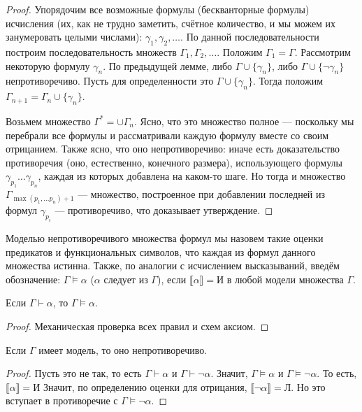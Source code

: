 \begin{proof}
Упорядочим все возможные формулы (бескванторные формулы) 
исчисления (их, как не трудно заметить,
счётное количество, и мы можем их занумеровать целыми числами):
$\gamma_1, \gamma_2, \dots$. По данной последовательности построим
последовательность множеств $\Gamma_1, \Gamma_2, \dots$.
Положим $\Gamma_1 = \Gamma$.
Рассмотрим некоторую формулу $\gamma_n$. По предыдущей лемме, либо 
$\Gamma \cup \{\gamma_n\}$, либо $\Gamma \cup \{\neg\gamma_n\}$ 
непротиворечиво. Пусть для определенности это $\Gamma \cup \{\gamma_n\}$.
Тогда положим $\Gamma_{n+1} = \Gamma_n \cup \{\gamma_n\}$.

Возьмем множество $\Gamma^* = \cup \Gamma_n$. Ясно, что это множество
полное --- поскольку мы перебрали все формулы и рассматривали каждую
формулу вместе со своим отрицанием.
Также ясно, что оно непротиворечиво: иначе есть
доказательство противоречия (оно, естественно, конечного размера),
использующего формулы $\gamma_{p_1} \dots \gamma_{p_n}$, каждая из которых
добавлена на каком-то шаге. Но тогда и множество 
$\Gamma_{\max(p_1, \dots p_n)+1}$ --- множество, построенное при добавлении
последней из формул $\gamma_{p_i}$ --- противоречиво, что доказывает 
утверждение.
\end{proof}

\begin{definition}
Моделью непротиворечивого множества формул мы назовем такие
оценки предикатов и функциональных символов, что каждая из формул данного
множества истинна. Также, по аналогии с исчислением высказываний,
введём обозначение: $\Gamma \models \alpha$ ($\alpha$ следует из $\Gamma$), 
если $\llbracket \alpha \rrbracket = \texttt{И}$ в любой модели
множества $\Gamma$.
\end{definition}

\begin{theorem}
Если $\Gamma \vdash \alpha$, то $\Gamma \models \alpha$.
\end{theorem}

\begin{proof}
Механическая проверка всех правил и схем аксиом.
\end{proof}

\begin{theorem}
Если $\Gamma$ имеет модель, то оно непротиворечиво.
\end{theorem}

\begin{proof}
Пусть это не так, то есть $\Gamma \vdash \alpha$ и $\Gamma \vdash \neg \alpha$.
Значит, $\Gamma \models \alpha$ и $\Gamma \models \neg \alpha$. То есть,
$\llbracket \alpha \rrbracket = \texttt{И}$
Значит, по определению оценки для отрицания, $\llbracket \neg\alpha \rrbracket = \texttt{Л}$.
Но это вступает в противоречие с $\Gamma \models \neg \alpha$.
\end{proof}

